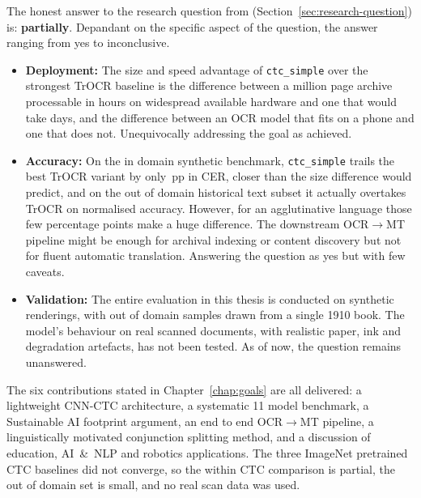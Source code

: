 The honest answer to the research question from (Section~\ref{sec:research-question}) is: \textbf{partially}. Depandant on the specific aspect of the question, the answer ranging from  yes to inconclusive.
\begin{itemize}
  \item \textbf{Deployment:} The size and speed advantage of \texttt{ctc\_simple} over the strongest TrOCR baseline is the difference between a million page archive processable in hours on widespread available hardware and one that would take days, and the difference between an OCR model that fits on a phone and one that does not. Unequivocally addressing the goal as achieved.
  \item \textbf{Accuracy:} On the in domain synthetic benchmark, \texttt{ctc\_simple} trails the best TrOCR variant by only \cerGap{}\,pp in CER, closer than the size difference would predict, and on the out of domain historical text subset it actually overtakes TrOCR on normalised accuracy. However, for an agglutinative language those few percentage points make a huge difference. The downstream OCR$\rightarrow$MT pipeline might be enough for archival indexing or content discovery but not for fluent automatic translation. Answering the question as yes but with few caveats.
  \item \textbf{Validation:} The entire evaluation in this thesis is conducted on synthetic renderings, with \bookTestSamples{} out of domain samples drawn from a single 1910 book. The model's behaviour on real scanned documents, with realistic paper, ink and degradation artefacts, has not been tested. As of now, the question remains unanswered.
\end{itemize}

The six contributions stated in Chapter~\ref{chap:goals} are all delivered: a lightweight CNN-CTC architecture, a systematic 11 model benchmark, a Sustainable AI footprint argument, an end to end OCR$\rightarrow$MT pipeline, a linguistically motivated conjunction splitting method, and a discussion of education, AI~\&~NLP and robotics applications. The three ImageNet pretrained CTC baselines did not converge, so the within CTC comparison is partial, the out of domain set is small, and no real scan data was used. 
